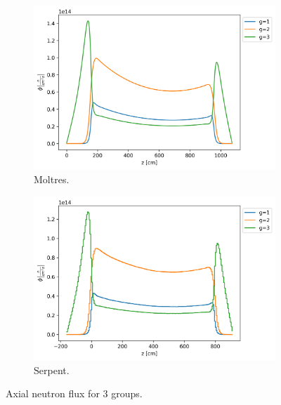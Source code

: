 \documentclass[11pt,letterpaper]{article}
\begin{document}
\begin{figure}[htbp!]
	\centering
	\begin{subfigure}[t]{0.4\textwidth}
		\centering
		\includegraphics[width=\linewidth]{figures/3D-assembly-LBP-1200-26G}
		\caption{Moltres.}
	\end{subfigure}
	\begin{subfigure}[t]{0.4\textwidth}
		\centering
		\includegraphics[width=\linewidth]{figures/serpent26G-LBP-1200-collapse}
		\caption{Serpent.}
	\end{subfigure}
	\hfill
	\caption{Axial neutron flux for 3 groups.}
	\label{fig:assembly-LBP-1200-flux}
\end{figure}
\end{document}
